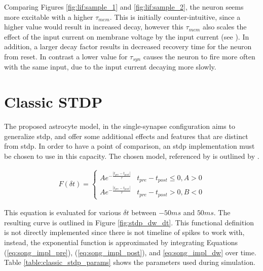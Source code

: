 

Comparing Figures \ref{fig:lif:sample_1} and \ref{fig:lif:sample_2}, the
neuron seems more excitable with a higher $\tau_{mem}$. This is initially
counter-intuitive, since a higher value would result in increased decay,
however this $\tau_{mem}$ also scales the effect of the input current on
membrane voltage by the input current (see ). In
addition, a larger decay factor results in decreased recovery time for the
neuron from reset. In contrast a lower value for $\tau_{syn}$ causes the
neuron to fire more often with the same input, due to the input current
decaying more slowly.

\section{Classic STDP} \label{obj1:sec:classic_stdp}
    
The proposed astrocyte model, in the single-synapse configuration aims to
generalize \gls{stdp}, and offer some additional effects and features that are
distinct from \gls{stdp}. In order to have a point of comparison, an \gls{stdp}
implementation must be chosen to use in this capacity. The chosen model,
referenced by  is outlined by  \parencite{song_2000}.

\begin{align}
  F(\delta t) =
  \begin{cases} 
    Ae^{- \frac{|t_{pre}-t_{post}|}{\tau}} & t_{pre} - t_{post} \leq 0, A > 0
    \\ Ae^{- \frac{|t_{pre}-t_{post}|}{\tau}} & t_{pre} - t_{post} > 0, B < 0
  \end{cases} \label{eq:song_classic_stdp}
\end{align}

This equation is evaluated for various $\delta t$ between $-50ms$ and
$50ms$. The resulting curve is outlined in Figure \ref{fig:stdp_dw_dt}. This
functional definition is not directly implemented since there is not timeline of
spikes to work with, instead, the exponential function is approximated by
integrating Equations (\ref{eq:song_impl_pre}), (\ref{eq:song_impl_post}), and
\ref{eq:song_impl_dw} over time. Table \ref{table:classic_stdp_params} shows the
parameters used during simulation.

